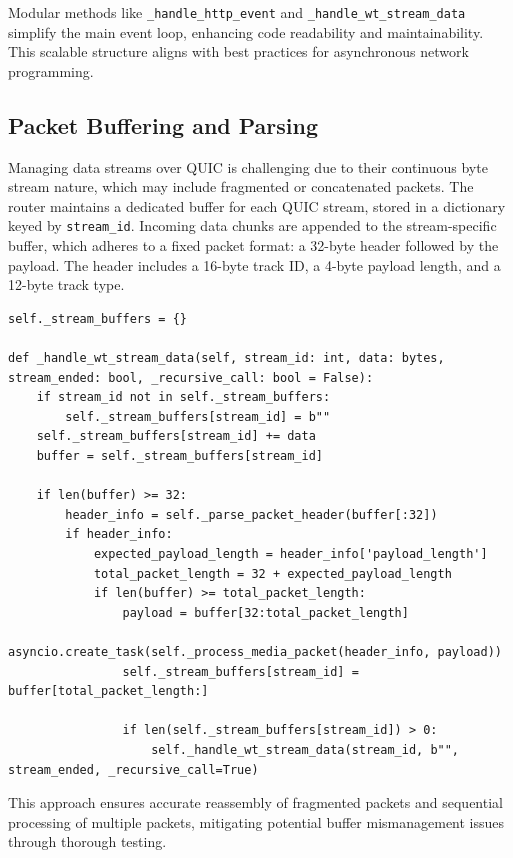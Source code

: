 Modular methods like \texttt{\_handle\_http\_event} and \texttt{\_handle\_wt\_stream\_data} simplify the main event loop, enhancing code readability and maintainability. This scalable structure aligns with best practices for asynchronous network programming.

\subsection{Packet Buffering and Parsing}
Managing data streams over QUIC is challenging due to their continuous byte stream nature, which may include fragmented or concatenated packets. The router maintains a dedicated buffer for each QUIC stream, stored in a dictionary keyed by \texttt{stream\_id}. Incoming data chunks are appended to the stream-specific buffer, which adheres to a fixed packet format: a 32-byte header followed by the payload. The header includes a 16-byte track ID, a 4-byte payload length, and a 12-byte track type.

\begin{lstlisting}
self._stream_buffers = {}

def _handle_wt_stream_data(self, stream_id: int, data: bytes, stream_ended: bool, _recursive_call: bool = False):
    if stream_id not in self._stream_buffers:
        self._stream_buffers[stream_id] = b""
    self._stream_buffers[stream_id] += data
    buffer = self._stream_buffers[stream_id]

    if len(buffer) >= 32:
        header_info = self._parse_packet_header(buffer[:32])
        if header_info:
            expected_payload_length = header_info['payload_length']
            total_packet_length = 32 + expected_payload_length
            if len(buffer) >= total_packet_length:
                payload = buffer[32:total_packet_length]
                asyncio.create_task(self._process_media_packet(header_info, payload))
                self._stream_buffers[stream_id] = buffer[total_packet_length:]

                if len(self._stream_buffers[stream_id]) > 0:
                    self._handle_wt_stream_data(stream_id, b"", stream_ended, _recursive_call=True)
\end{lstlisting}

This approach ensures accurate reassembly of fragmented packets and sequential processing of multiple packets, mitigating potential buffer mismanagement issues through thorough testing.

